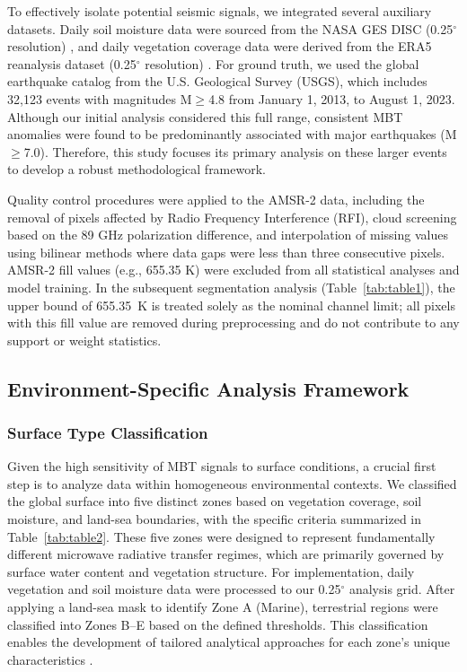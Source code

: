 \documentclass[preprint,review,12pt,authoryear]{elsarticle}
\begin{document}
To effectively isolate potential seismic signals, we integrated several auxiliary datasets. Daily soil moisture data were sourced from the NASA GES DISC (0.25$^{\circ}$ resolution) \citep{fangGlobalLandData2009}, and daily vegetation coverage data were derived from the ERA5 reanalysis dataset (0.25$^{\circ}$ resolution) \citep{hersbachERA5GlobalReanalysis2020,munoz-sabaterERA5landStateoftheartGlobal2021}. For ground truth, we used the global earthquake catalog from the U.S. Geological Survey (USGS), which includes 32,123 events with magnitudes M$\ge$4.8 from January 1, 2013, to August 1, 2023. Although our initial analysis considered this full range, consistent MBT anomalies were found to be predominantly associated with major earthquakes (M$\ge$7.0). Therefore, this study focuses its primary analysis on these larger events to develop a robust methodological framework.

Quality control procedures were applied to the AMSR-2 data, including the removal of pixels affected by Radio Frequency Interference (RFI), cloud screening based on the 89 GHz polarization difference, and interpolation of missing values using bilinear methods where data gaps were less than three consecutive pixels. AMSR-2 fill values (e.g., 655.35 K) were excluded from all statistical analyses and model training. In the subsequent segmentation analysis (Table~\ref{tab:table1}), the upper bound of 655.35~K is treated solely as the nominal channel limit; all pixels with this fill value are removed during preprocessing and do not contribute to any support or weight statistics.

\subsection{Environment-Specific Analysis Framework}\label{sec:env_framework}

\subsubsection{Surface Type Classification}\label{sec:surface_classification}
Given the high sensitivity of MBT signals to surface conditions, a crucial first step is to analyze data within homogeneous environmental contexts. We classified the global surface into five distinct zones based on vegetation coverage, soil moisture, and land-sea boundaries, with the specific criteria summarized in Table~\ref{tab:table2}. These five zones were designed to represent fundamentally different microwave radiative transfer regimes, which are primarily governed by surface water content and vegetation structure. For implementation, daily vegetation and soil moisture data were processed to our 0.25$^{\circ}$ analysis grid. After applying a land-sea mask to identify Zone A (Marine), terrestrial regions were classified into Zones B--E based on the defined thresholds. This classification enables the development of tailored analytical approaches for each zone's unique characteristics \citep{oweMethodologySurfaceSoil2001}.
\end{document}
